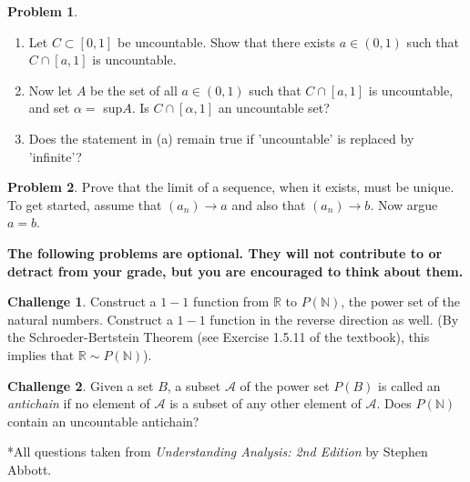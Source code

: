 \documentclass{amsart}
\newcommand{\+}[1]{\ensuremath{\mathbf{#1}}}
\newcommand{\R}{{\mathbb R}}
\theoremstyle{definition}
\newtheorem{prob}{Problem}
\newtheorem{chal}{Challenge}
\begin{document}
\begin{prob}
 \begin{enumerate}
  \item Let $C \subset [0,1]$ be uncountable. 
  Show that there exists $a \in (0,1)$
  such that $C \cap [a,1]$ is uncountable.
  \item Now let $A$ be the set of all
  $a \in (0,1)$ such that $C \cap [a,1]$
  is uncountable, and set $\alpha = $ sup$A$.
  Is $C \cap [\alpha,1]$ an uncountable set?
  \item Does the statement in (a) remain
  true if 'uncountable'
  is replaced by 'infinite'?
 \end{enumerate}
\end{prob}


\begin{prob}
 Prove that the limit of a sequence, when it exists, must be unique.
 To get started, assume that $(a_n) \to a$
 and also that $(a_n) \to b$.  Now argue $a = b$.
\end{prob}


\vspace{5mm}

{\bf The following problems are optional.  They
will not contribute to or detract from your grade, but you are encouraged
to think about them.}

\vspace{5mm}

\begin{chal}
 Construct a $1-1$ function from $\R$
 to $P(\mathbb{N})$,
 the power set of the natural numbers.
 Construct a $1-1$ function in the reverse
 direction as well.
 (By the Schroeder-Bertstein Theorem (see Exercise 1.5.11
 of the textbook), this implies that $\R \sim P(\mathbb{N})$).
 
\end{chal}

\begin{chal}
Given a set $B$, a subset $\mathcal{A}$ of the power set 
$P(B)$ is called an \emph{antichain}
if no element of $\mathcal{A}$ is a subset
of any other element of $\mathcal{A}$.
Does $P(\mathbb{N})$
contain an uncountable antichain?
\end{chal}



\vspace{5mm}

*All questions taken from \emph{Understanding Analysis: 2nd Edition} by Stephen Abbott.
\end{document}
